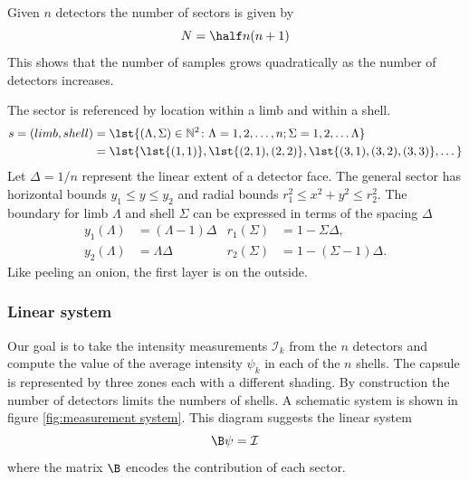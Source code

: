 \documentclass[final,leqno,onefignum,onetabnum]{siamltex1213}
\begin{document}
\begin{figure}
  \centering
\end{figure}

Given $n$ detectors the number of sectors is given by
  \begin{equation}
    N = \half n (n+1)
  \end{equation}
This shows that the number of samples grows quadratically as the number of detectors increases.

The sector is referenced by location within a limb and within a shell.
  \begin{equation}
    \begin{split}
    s = (limb, shell) 
    &= \lst{(\Lambda,\Sigma)\in\mathbb{N}^{2}\colon \Lambda = 1,2,\dots,n; \Sigma=1,2,\dots \Lambda}\\
    &=\lst{\lst{(1,1)},\lst{(2,1),(2,2)},\lst{(3,1),(3,2),(3,3)},\dots}
    \end{split}
  \end{equation}
Let $\Delta = 1/n$ represent the linear extent of a detector face. The general sector has horizontal bounds $y_{1} \le y \le y_{2}$ and radial bounds $r_{1}^{2} \le x^{2} + y^{2} \le r_{2}^{2}$. The boundary for limb $\Lambda$ and shell $\Sigma$ can be expressed in terms of the spacing $\Delta$
\begin{align}
%
y_{1}(\Lambda) &= (\Lambda-1)\Delta &
r_{1}(\Sigma)   &= 1 - \Sigma \Delta,\\
%
y_{2}(\Lambda) &= \Lambda \Delta &
r_{2}(\Sigma)   &= 1 - (\Sigma - 1) \Delta.
%
\end{align}
Like peeling an onion, the first layer is on the outside.

\subsubsection{Linear system}
Our goal is to take the intensity measurements $\mathcal{I}_{k}$ from the $n$ detectors and compute the value of the average intensity $\psi_{k}$ in each of the $n$ shells. The capsule is represented by three zones each with a different shading. By construction the number of detectors limits the numbers of shells. A schematic system is shown in figure \eqref{fig:measurement system}. This diagram suggests the linear system
  \begin{equation}
    \B \psi = \mathcal{I}
  \end{equation}
where the matrix $\B$ encodes the contribution of each sector. 
\end{document}

